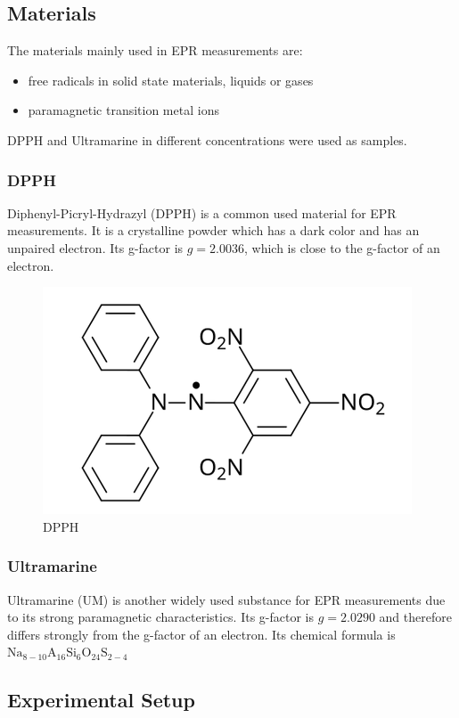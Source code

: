 \documentclass{article}
\begin{document}
\subsection{Materials}
The materials mainly used in EPR measurements are: 

\begin{itemize}
  \item free radicals in solid state materials, liquids or gases
  \item paramagnetic transition metal ions
\end{itemize}

DPPH and Ultramarine in different concentrations were used as samples.

\subsubsection{DPPH}
Diphenyl-Picryl-Hydrazyl (DPPH) is a common used material for EPR measurements. It is a crystalline powder which has a dark color and has an unpaired electron. Its g-factor is $g = 2.0036$, which is close to the g-factor of an electron.

\begin{figure}[h]
    \centering
    \includegraphics[width=0.5\linewidth]{Figures/Intro/5.png}
    \caption{DPPH \cite{a2020_dpph}}
    \label{fig:dpph}
\end{figure}

\subsubsection{Ultramarine}
Ultramarine (UM) is another widely used substance for EPR measurements due to its strong paramagnetic characteristics. Its g-factor is $g = 2.0290$ and therefore differs strongly from the g-factor of an electron. Its chemical formula is $\text{Na}_{8-10}\text{A}_{16}\text{Si}_{6}\text{O}_{24}\text{S}_{2-4}$

\pagebreak{}

\subsection{Experimental Setup}
\end{document}
